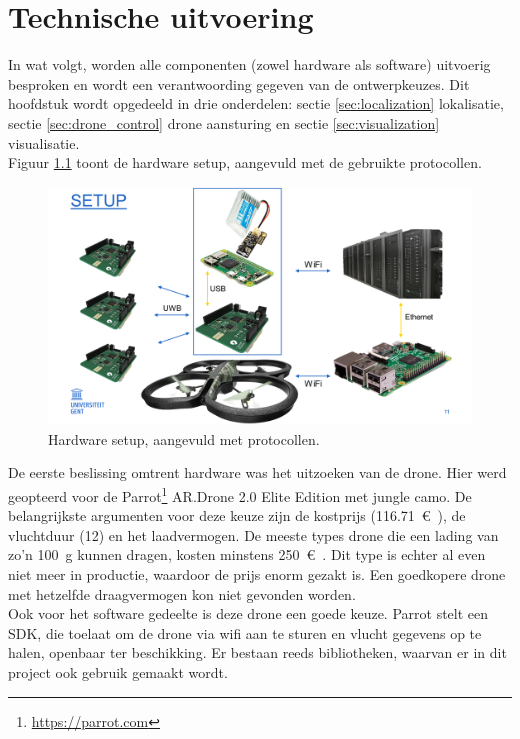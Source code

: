 \chapter{Technische uitvoering}
In wat volgt, worden alle componenten (zowel hardware als software) uitvoerig besproken en wordt een verantwoording gegeven van de ontwerpkeuzes.
Dit hoofdstuk wordt opgedeeld in drie onderdelen: sectie \ref{sec:localization} lokalisatie, sectie \ref{sec:drone_control} drone aansturing en sectie \ref{sec:visualization} visualisatie.\\

Figuur \ref{fig:setup} toont de hardware setup, aangevuld met de gebruikte protocollen.\\
\begin{figure}[p]
	\centering
	\includegraphics[width=\textwidth]{Setup}
	\caption[Setup]{Hardware setup, aangevuld met protocollen.}
	\label{fig:setup}
\end{figure}

De eerste beslissing omtrent hardware was het uitzoeken van de drone.
Hier werd geopteerd voor de Parrot\footnote{\url{https://parrot.com}} AR.Drone 2.0 Elite Edition met jungle camo.
De belangrijkste argumenten voor deze keuze zijn de kostprijs (\SI{116.71}{\euro{}}), de vluchtduur (\SI{12}{\min}) en het laadvermogen.
De meeste types drone die een lading van zo'n \SI{100}{\g} kunnen dragen, kosten minstens \SI{250}{\euro{}}.
Dit type is echter al even niet meer in productie, waardoor de prijs enorm gezakt is.
Een goedkopere drone met hetzelfde draagvermogen kon niet gevonden worden.\\

Ook voor het software gedeelte is deze drone een goede keuze. Parrot stelt een SDK, die toelaat om de drone via wifi aan te sturen en vlucht gegevens op te halen, openbaar ter beschikking.
Er bestaan reeds bibliotheken, waarvan er in dit project ook gebruik gemaakt wordt.\\

